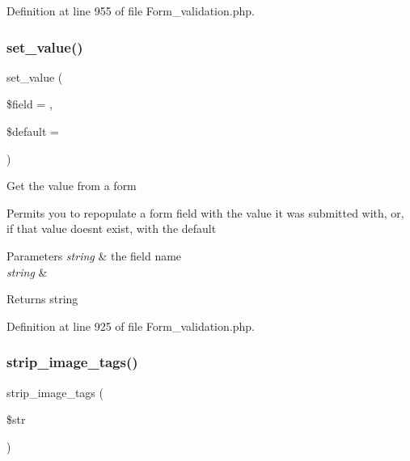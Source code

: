 Definition at line 955 of file Form\+\_\+validation.\+php.

\mbox{\label{class_c_i___form__validation_af9a77be3fc2da5df878efad37d1c0fe8}} 
\subsubsection{\texorpdfstring{set\_value()}{set\_value()}}
{\footnotesize\ttfamily set\+\_\+value (\begin{DoxyParamCaption}\item[{}]{\$field = {\ttfamily \textquotesingle{}\textquotesingle{}},  }\item[{}]{\$default = {\ttfamily \textquotesingle{}\textquotesingle{}} }\end{DoxyParamCaption})}

Get the value from a form

Permits you to repopulate a form field with the value it was submitted with, or, if that value doesn\textquotesingle{}t exist, with the default


\begin{DoxyParams}{Parameters}
{\em string} & the field name \\
\hline
{\em string} & \\
\hline
\end{DoxyParams}
\begin{DoxyReturn}{Returns}
string 
\end{DoxyReturn}


Definition at line 925 of file Form\+\_\+validation.\+php.

\mbox{\label{class_c_i___form__validation_abb836a42971c7bc641588db779c6ab1d}} 
\subsubsection{\texorpdfstring{strip\_image\_tags()}{strip\_image\_tags()}}
{\footnotesize\ttfamily strip\+\_\+image\+\_\+tags (\begin{DoxyParamCaption}\item[{}]{\$str }\end{DoxyParamCaption})}

